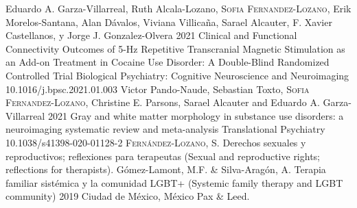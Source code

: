 \vspace{-3mm}
{
\setlength\tabcolsep{0pt} \setlength{\extrarowheight}{0pt}%
\begin{itemize}[leftmargin=5ex, nosep, noitemsep, itemindent=-13pt,
    label=\raisebox{0.25ex}{\tiny$\bullet$}]%
    \vspace{-1.8mm}%
    \cvarticle
    {Eduardo A. Garza-Villarreal, Ruth Alcala-Lozano,
      {\scshape{Sofia Fernandez-Lozano}}, Erik Morelos-Santana,
      Alan Dávalos, Viviana Villicaña, Sarael Alcauter,
      F. Xavier Castellanos, y Jorge J. Gonzalez-Olvera}
    {2021}
    {Clinical and Functional Connectivity Outcomes of 5-Hz Repetitive Transcranial Magnetic Stimulation as an Add-on Treatment in Cocaine Use Disorder: A Double-Blind Randomized Controlled Trial}
    {Biological Psychiatry: Cognitive Neuroscience and Neuroimaging}
    {\\10.1016/j.bpsc.2021.01.003}
    \cvarticle
    {Victor Pando-Naude, Sebastian Toxto, {\scshape{Sofia Fernandez-Lozano}},
      Christine E. Parsons, Sarael Alcauter and Eduardo A. Garza-Villarreal}
    {2021}
    {Gray and white matter morphology in substance use disorders: a neuroimaging systematic review and meta-analysis}
    {Translational Psychiatry}
    {\\10.1038/s41398-020-01128-2}
    \cvchapt
        {\scshape{Fernández-Lozano, S.}}
        {Derechos sexuales y reproductivos; reflexiones para terapeutas
        (Sexual and reproductive rights; reflections for therapists).}
        {Gómez-Lamont, M.F. \& Silva-Aragón, A.}
        {Terapia familiar sistémica y la comunidad LGBT+ (Systemic family therapy and
        LGBT community)}
        {2019}
        {Ciudad de México, México}
        {Pax \& Leed.}
\end{itemize}
}
